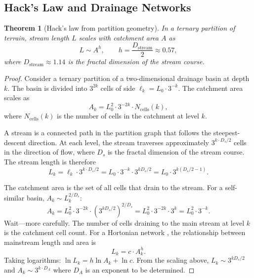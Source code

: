 \documentclass[10pt,twocolumn]{article}
\newtheorem{theorem}{Theorem}[section]
\theoremstyle{definition}
\theoremstyle{remark}
\begin{document}
\subsection{Hack's Law and Drainage Networks}\label{sec:hack}

\begin{theorem}[Hack's law from partition geometry]
\label{thm:hack}
In a ternary partition of terrain, stream length $L$ scales
with catchment area $A$ as
\begin{equation}\label{eq:hack}
  L \sim A^{h},\qquad h = \frac{D_{\mathrm{stream}}}{2}
  \approx 0.57,
\end{equation}
where $D_{\mathrm{stream}}\approx 1.14$ is the fractal
dimension of the stream course.
\end{theorem}

\begin{proof}
Consider a ternary partition of a two-dimensional drainage
basin at depth $k$.  The basin is divided into $3^{2k}$
cells of side $\ell_k = L_0\cdot 3^{-k}$.  The catchment area
scales as
\begin{equation}
  A_k = L_0^2 \cdot 3^{-2k}\cdot N_{\mathrm{cells}}(k),
\end{equation}
where $N_{\mathrm{cells}}(k)$ is the number of cells in the
catchment at level $k$.

A stream is a connected path in the partition graph that
follows the steepest-descent direction.  At each level, the
stream traverses approximately $3^{k\cdot D_s/2}$ cells in the
direction of flow, where $D_s$ is the fractal dimension of the
stream course.  The stream length is therefore
\begin{equation}
  L_k = \ell_k \cdot 3^{k\cdot D_s/2}
  = L_0 \cdot 3^{-k}\cdot 3^{k D_s/2}
  = L_0\cdot 3^{k(D_s/2-1)}.
\end{equation}

The catchment area is the set of all cells that drain to the
stream.  For a self-similar basin, $A_k\sim L_k^{2/D_s}$:
\begin{equation}
  A_k = L_0^2\cdot 3^{-2k}\cdot(3^{kD_s/2})^{2/D_s}
  = L_0^2\cdot 3^{-2k}\cdot 3^{k}
  = L_0^2\cdot 3^{-k}.
\end{equation}
Wait---more carefully.  The number of cells draining to the
main stream at level $k$ is the catchment cell count.  For a
Hortonian network \citep{Horton1945}, the relationship between
mainstream length and area is
\begin{equation}
  L_k = c\cdot A_k^h.
\end{equation}
Taking logarithms: $\ln L_k = h\ln A_k + \ln c$.  From the
scaling above, $L_k \sim 3^{k D_s/2}$ and
$A_k\sim 3^{k\cdot D_A}$ where $D_A$ is an exponent to be
determined.


\end{proof}
\end{document}
